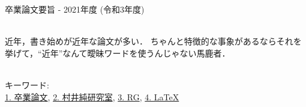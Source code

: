 卒業論文要旨 - 2021年度 (令和3年度)
\begin{center}
\begin{large}
\end{large}
\end{center}

~ \\

近年，書き始めが近年な論文が多い．
ちゃんと特徴的な事象があるならそれを挙げて，``近年''なんて曖昧ワードを使うんじゃない馬鹿者．

~ \\
キーワード:\\
\underline{1. 卒業論文},
\underline{2. 村井純研究室},
\underline{3. RG},
\underline{4. LaTeX}
\begin{flushright}
\dept \\
\author
\end{flushright}
